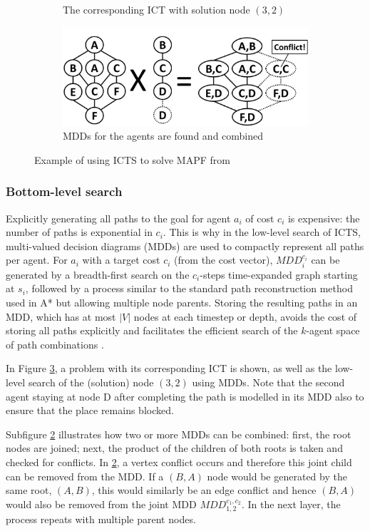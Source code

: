 \documentclass[english,10pt]{article}
\begin{document}
\begin{figure}[b]
\begin{subfigure}{0.3\textwidth}
			\caption{The corresponding ICT with solution node $(3,2)$}
			\label{fig:ict2}
		\end{subfigure}
		\hfill
		\begin{subfigure}{0.4\textwidth}
			\centering
			\includegraphics[width=\linewidth]{img/mdds}
			\caption{MDDs for the agents are found and combined}
			\label{fig:mdds}
		\end{subfigure}
		
		\caption{Example of using ICTS to solve MAPF from \cite{sharon2011}}
		\label{fig:bottom}
	\end{figure}
	\subsubsection{Bottom-level search}
	Explicitly generating all paths to the goal for agent $a_i$ of cost $c_i$ is expensive: the number of paths is exponential in $c_i$. This is why in the low-level search of ICTS, multi-valued decision diagrams (MDDs) are used to compactly represent all paths per agent. For $a_i$ with a target cost $c_i$ (from the cost vector), $MDD_i^{c_i}$ can be generated by a breadth-first search on the $c_i$-steps time-expanded graph starting at $s_i$, followed by a process similar to the standard path reconstruction method used in A* but allowing multiple node parents. Storing the resulting paths in an MDD, which has at most $|V|$ nodes at each timestep or depth, avoids the cost of storing all paths explicitly and facilitates the efficient search of the $k$-agent space of path combinations \cite{sharon2011}.
	
	In Figure \ref{fig:bottom}, a problem with its corresponding ICT is shown, as well as the low-level search of the (solution) node $(3,2)$ using MDDs. Note that the second agent staying at node D after completing the path is modelled in its MDD also to ensure that the place remains blocked.
	
	Subfigure \ref{fig:mdds} illustrates how two or more MDDs can be combined: first, the root nodes are joined; next, the product of the children of both roots is taken and checked for conflicts. In \ref{fig:mdds}, a vertex conflict occurs and therefore this joint child can be removed from the MDD. If a $(B,A)$ node would be generated by the same root, $(A,B)$, this would similarly be an edge conflict and hence $(B,A)$ would also be removed from the joint MDD $MDD_{1,2}^{c_1,c_2}$. In the next layer, the process repeats with multiple parent nodes.
	
\end{document}
